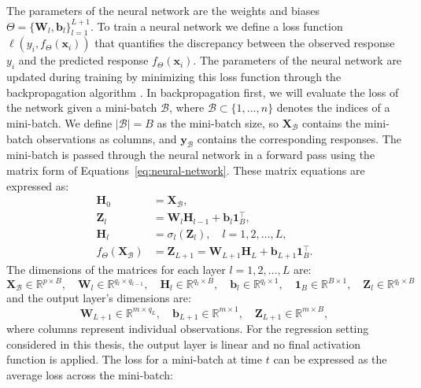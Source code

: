 The parameters of the neural network are the weights and biases \(\Theta = \{\mathbf{W}_l, \mathbf{b}_l\}_{l=1}^{L+1}\). To train a neural network we define a loss function \(\ell(y_i, f_{\Theta}(\mathbf{x}_i))\) that quantifies the discrepancy between the observed response \(y_i\) and the predicted response \(f_{\Theta}(\mathbf{x}_i)\). The parameters of the neural network are updated during training by minimizing this loss function through the backpropagation algorithm \parencite{smlbook}. In backpropagation first, we will evaluate the loss of the network given a mini-batch \(\mathcal{B}\), where \(\mathcal{B} \subset \{1,...,n\}\) denotes the indices of a mini-batch. We define \(|\mathcal{B}| = B\) as the mini-batch size, so \(\mathbf{X}_{\mathcal{B}} \) contains the mini-batch observations as columns, and \(\mathbf{y}_{\mathcal{B}} \) contains the corresponding responses. The mini-batch is passed through the neural network in a forward pass using the matrix form of Equations~\ref{eq:neural-network}. These matrix equations are expressed as:
\begin{equation}\label{eq:neural-network-matrix}
\begin{aligned}
\mathbf{H}_0 &= \mathbf{X}_{\mathcal{B}}, \\
\mathbf{Z}_l &= \mathbf{W}_l\mathbf{H}_{l-1} + \mathbf{b}_l\mathbf{1}_B^\top, \\
\mathbf{H}_{l} &= \sigma_l(\mathbf{Z}_l),
\quad l = 1,2,\ldots,L, \\
f_\Theta(\mathbf{X}_{\mathcal{B}}) &= \mathbf{Z}_{L+1} = \mathbf{W}_{L+1}\mathbf{H}_L + \mathbf{b}_{L+1}\mathbf{1}_B^\top.
\end{aligned}
\end{equation}
The dimensions of the matrices for each layer \(l = 1,2,\ldots,L\) are:
\[\mathbf{X}_{\mathcal{B}} \in \mathbb{R}^{p \times B},
\quad \mathbf{W}_l \in \mathbb{R}^{q_l \times q_{l-1}},
\quad \mathbf{H}_{l} \in \mathbb{R}^{q_l \times B},
\quad \mathbf{b}_l \in \mathbb{R}^{q_l \times 1},
\quad \mathbf{1}_B \in \mathbb{R}^{B \times 1},
\quad \mathbf{Z}_l \in \mathbb{R}^{q_l \times B}\]
and the output layer's dimensions are:
\[\mathbf{W}_{L+1} \in \mathbb{R}^{m \times q_L},
\quad \mathbf{b}_{L+1} \in \mathbb{R}^{m \times 1},
\quad \mathbf{Z}_{L+1} \in \mathbb{R}^{m \times B},\]
where columns represent individual observations. 
For the regression setting considered in this thesis, the output layer is linear and no final activation function is applied. The loss for a mini-batch at time \(t\) can be expressed as the average loss across the mini-batch:

